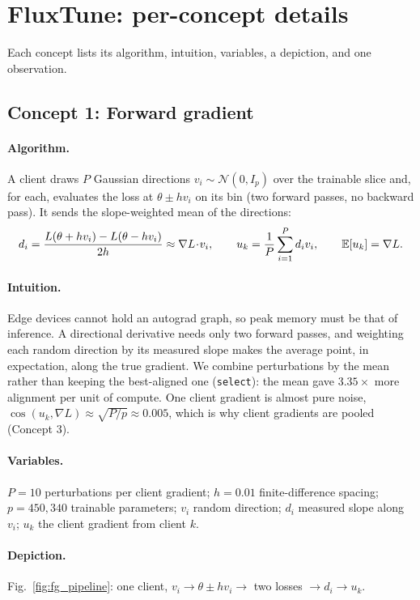 \section{FluxTune: per-concept details}
\label{app:fluxtune}
Each concept lists its algorithm, intuition, variables, a depiction, and one observation.

\subsection{Concept 1: Forward gradient}
\paragraph{Algorithm.}
A client draws $P$ Gaussian directions $v_i\sim\mathcal{N}(0,I_p)$ over the trainable slice and, for each,
evaluates the loss at $\theta\pm h v_i$ on its bin (two forward passes, no backward pass). It sends the
slope-weighted mean of the directions:
\begin{equation}
d_i=\frac{L(\theta+hv_i)-L(\theta-hv_i)}{2h}\approx\nabla L\!\cdot\! v_i,\qquad
u_k=\frac1P\sum_{i=1}^{P}d_i v_i,\qquad \mathbb{E}[u_k]=\nabla L .
\end{equation}
\paragraph{Intuition.}
Edge devices cannot hold an autograd graph, so peak memory must be that of inference. A directional
derivative needs only two forward passes, and weighting each random direction by its measured slope makes
the average point, in expectation, along the true gradient. We combine perturbations by the mean rather than keeping the
best-aligned one (\texttt{select}): the mean gave $3.35\times$ more alignment per unit of compute.
One client gradient is almost pure noise, $\cos(u_k,\nabla L)\approx\sqrt{P/p}\approx0.005$, which is why client gradients are pooled (Concept 3).
\paragraph{Variables.}
$P{=}10$ perturbations per client gradient; $h{=}0.01$ finite-difference spacing; $p{=}450{,}340$ trainable parameters;
$v_i$ random direction; $d_i$ measured slope along $v_i$; $u_k$ the client gradient from client $k$.
\paragraph{Depiction.} Fig.~\ref{fig:fg_pipeline}: one client, $v_i\to\theta\pm hv_i\to$ two losses $\to d_i\to u_k$.
